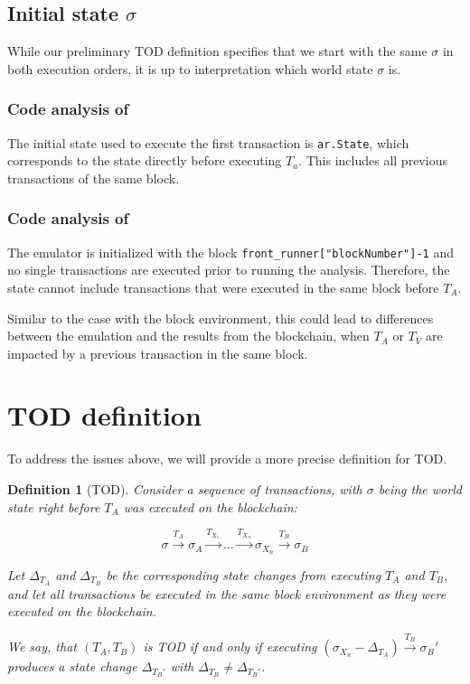 \documentclass[draft,final]{vutinfth} %
\newtheorem{definition}{Definition}
\begin{document}
\subsection{Initial state $\sigma$}

While our preliminary TOD definition specifies that we start with the same $\sigma$ in both execution orders, it is up to interpretation which world state $\sigma$ is.

\subsubsection{Code analysis of \cite{zhang_combatting_2023}}

The initial state used to execute the first transaction is \verb|ar.State|, which corresponds to the state directly before executing $T_a$. This includes all previous transactions of the same block.

\subsubsection{Code analysis of \cite{torres_frontrunner_2021}}

The emulator is initialized with the block \verb|front_runner["blockNumber"]-1| and no single transactions are executed prior to running the analysis. Therefore, the state cannot include transactions that were executed in the same block before $T_A$.

Similar to the case with the block environment, this could lead to differences between the emulation and the results from the blockchain, when $T_A$ or $T_V$ are impacted by a previous transaction in the same block.

\section{TOD definition}

To address the issues above, we will provide a more precise definition for TOD.

\begin{definition}[TOD]
    Consider a sequence of transactions, with $\sigma$ being the world state right before $T_A$ was executed on the blockchain:

    $$\sigma \xrightarrow{T_A} \sigma_A \xrightarrow{T_{X_1}} \dots \xrightarrow{T_{X_n}} \sigma_{X_n} \xrightarrow{T_B} \sigma_B$$

    Let $\Delta_{T_A}$ and $\Delta_{T_B}$ be the corresponding state changes from executing $T_A$ and $T_B$, and let all transactions be executed in the same block environment as they were executed on the blockchain.

    We say, that $(T_A, T_B)$ is TOD if and only if executing $(\sigma_{X_n} - \Delta_{T_A}) \xrightarrow{T_B} \sigma_B\prime$ produces a state change $\Delta_{T_B\prime}$ with $\Delta_{T_B} \neq \Delta_{T_B\prime}$.
\end{definition}
\end{document}
